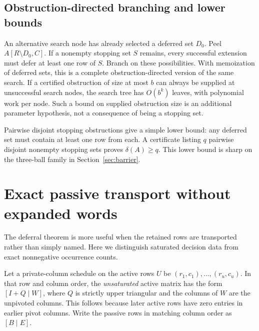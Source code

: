 \documentclass[11pt]{article}
\theoremstyle{definition}\newtheorem{definition}[theorem]{Definition}
\theoremstyle{remark}\newtheorem{remark}[theorem]{Remark}
\begin{document}
\subsection{Obstruction-directed branching and lower bounds}
An alternative search node has already selected a deferred set $D_0$. Peel $A[R\setminus D_0,C]$. If a nonempty stopping set $S$ remains, every successful extension must defer at least one row of $S$. Branch on these possibilities. With memoization of deferred sets, this is a complete obstruction-directed version of the same search. If a certified obstruction of size at most $b$ can always be supplied at unsuccessful search nodes, the search tree has $O(b^k)$ leaves, with polynomial work per node. Such a bound on supplied obstruction size is an additional parameter hypothesis, not a consequence of being a stopping set.

Pairwise disjoint stopping obstructions give a simple lower bound: any deferred set must contain at least one row from each. A certificate listing $q$ pairwise disjoint nonempty stopping sets proves $\delta(A)\geq q$. This lower bound is sharp on the three-ball family in Section~\ref{sec:barrier}.

\section{Exact passive transport without expanded words}
\label{sec:transport}
The deferral theorem is more useful when the retained rows are transported rather than simply named. Here we distinguish saturated decision data from exact nonnegative occurrence counts.

Let a private-column schedule on the active rows $U$ be $(r_1,c_1),\ldots,(r_u,c_u)$. In that row and column order, the \emph{unsaturated} active matrix has the form $[I+Q\mid W]$, where $Q$ is strictly upper triangular and the columns of $W$ are the unpivoted columns. This follows because later active rows have zero entries in earlier pivot columns. Write the passive rows in matching column order as $[B\mid E]$.
\end{document}
